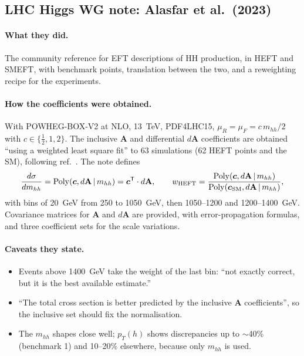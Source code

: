 \subsection{LHC Higgs WG note: Alasfar et al.\ (2023) \cite{Alasfar2023}}
\label{sec:alasfar}

\paragraph{What they did.} The community reference for EFT descriptions of HH production,
in HEFT and SMEFT, with benchmark points, translation between the two, and a reweighting
recipe for the experiments.

\paragraph{How the coefficients were obtained.} With POWHEG-BOX-V2  at NLO,
13~TeV, PDF4LHC15, $\mu_R=\mu_F=c\,m_{hh}/2$ with $c\in\{\tfrac12,1,2\}$. The inclusive
\textbf{A} and differential $d\textbf{A}$ coefficients are obtained ``using a weighted least
square fit'' to 63 simulations (62 HEFT points and the SM), following ref.~\cite{Buchalla2018}.
The note defines
\begin{equation}
\frac{d\sigma}{dm_{hh}} = \mathrm{Poly}(\boldsymbol{c}, d\textbf{A}\,|\,m_{hh})
  = \boldsymbol{c}^{\mathsf T}\cdot d\textbf{A}, \qquad
w_{\rm HEFT} = \frac{\mathrm{Poly}(\boldsymbol{c}, d\textbf{A}\,|\,m_{hh})}
  {\mathrm{Poly}(\boldsymbol{c}_{\rm SM}, d\textbf{A}\,|\,m_{hh})},
\label{eq:alasfar}
\end{equation}
with bins of 20~GeV from 250 to 1050~GeV, then 1050--1200 and 1200--1400~GeV. Covariance
matrices for $\textbf{A}$ and $d\textbf{A}$ are provided, with error-propagation formulas, and
three coefficient sets for the scale variations.

\paragraph{Caveats they state.}
\begin{itemize}
  \item Events above 1400~GeV take the weight of the last bin: ``not exactly correct, but it
    is the best available estimate.''
  \item ``The total cross section is better predicted by the inclusive \textbf{A}
    coefficients'', so the inclusive set should fix the normalisation.
  \item The $m_{hh}$ shapes close well; $p_T(h)$ shows discrepancies up to $\sim$40\%
    (benchmark 1) and 10--20\% elsewhere, because only $m_{hh}$ is used.
\end{itemize}

